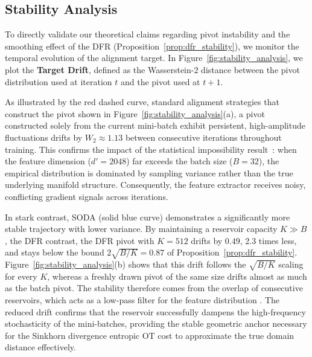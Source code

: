 \documentclass[preprint,12pt]{elsarticle}
\providecommand{\DIFadd}[1]{{\protect\color{blue} \sf #1}} %
\providecommand{\DIFdel}[1]{{\protect\color{red} \scriptsize #1}} %
\providecommand{\DIFaddbegin}{} %
\providecommand{\DIFaddend}{} %
\providecommand{\DIFdelbegin}{} %
\providecommand{\DIFdelend}{} %
\newcommand{\DIFscaledelfig}{0.5}
\newlength{\DIFdelgraphicswidth} %
\newlength{\DIFdelgraphicsheight} %
\newcommand{\DIFaddincludegraphics}[2][]{{\color{blue}\fbox{\DIFOincludegraphics[#1]{#2}}}} %
\newcommand{\DIFdelincludegraphics}[2][]{%
\sbox{\DIFdelgraphicsbox}{\DIFOincludegraphics[#1]{#2}}%
\settoboxwidth{\DIFdelgraphicswidth}{\DIFdelgraphicsbox} %
\settoboxtotalheight{\DIFdelgraphicsheight}{\DIFdelgraphicsbox} %
\scalebox{\DIFscaledelfig}{%
\parbox[b]{\DIFdelgraphicswidth}{\usebox{\DIFdelgraphicsbox}\\[-\baselineskip] \rule{\DIFdelgraphicswidth}{0em}}\llap{\resizebox{\DIFdelgraphicswidth}{\DIFdelgraphicsheight}{%
\setlength{\unitlength}{\DIFdelgraphicswidth}%
\begin{picture}(1,1)%
\thicklines\linethickness{2pt} %
{\color[rgb]{1,0,0}\put(0,0){\framebox(1,1){}}}%
{\color[rgb]{1,0,0}\put(0,0){\line( 1,1){1}}}%
{\color[rgb]{1,0,0}\put(0,1){\line(1,-1){1}}}%
\end{picture}%
}\hspace*{3pt}}} %
} %
\DeclareRobustCommand{\DIFaddbegin}{\DIFOaddbegin \let\includegraphics\DIFaddincludegraphics} %
\DeclareRobustCommand{\DIFaddend}{\DIFOaddend \let\includegraphics\DIFOincludegraphics} %
\DeclareRobustCommand{\DIFdelbegin}{\DIFOdelbegin \let\includegraphics\DIFdelincludegraphics} %
\DeclareRobustCommand{\DIFdelend}{\DIFOaddend \let\includegraphics\DIFOincludegraphics} %
\begin{document}
\subsection{Stability Analysis}
\label{sec:stability_analysis}

To directly validate our theoretical claims regarding pivot instability and the smoothing effect of the DFR (Proposition~\ref{prop:dfr_stability}), we monitor the temporal evolution of the alignment target. In Figure~\ref{fig:stability_analysis}, we plot the \textbf{Target Drift}, defined as the Wasserstein-2 distance between the pivot distribution used at iteration $t$ and the pivot used at $t+1$.

As \DIFdelbegin \DIFdel{illustrated by the red dashed curve, standard alignment strategies that construct the pivot }\DIFdelend \DIFaddbegin \DIFadd{shown in Figure~\ref{fig:stability_analysis}(a), a pivot constructed }\DIFaddend solely from the current mini-batch \DIFdelbegin \DIFdel{exhibit persistent, high-amplitude fluctuations}\DIFdelend \DIFaddbegin \DIFadd{drifts by $W_2\approx1.13$ between consecutive iterations throughout training}\DIFaddend . This confirms the impact of the statistical impossibility result~\citep{dong2025distribution}: when the feature dimension ($d'=2048$) far exceeds the batch size ($B=32$), the empirical distribution is dominated by sampling variance rather than the true underlying manifold structure. Consequently, the feature extractor receives noisy, conflicting gradient signals across iterations.

In \DIFdelbegin \DIFdel{stark contrast, SODA (solid blue curve) demonstrates a significantly more stable trajectory with lower variance. By maintaining a reservoir capacity $K \gg B$, the DFR }\DIFdelend \DIFaddbegin \DIFadd{contrast, the DFR pivot with $K=512$ drifts by $0.49$, 2.3 times less, and stays below the bound $2\sqrt{B/K}=0.87$ of Proposition~\ref{prop:dfr_stability}. Figure~\ref{fig:stability_analysis}(b) shows that this drift follows the $\sqrt{B/K}$ scaling for every $K$, whereas a freshly drawn pivot of the same size drifts almost as much as the batch pivot. The stability therefore comes from the overlap of consecutive reservoirs, which }\DIFaddend acts as a low-pass filter for the feature distribution\DIFdelbegin \DIFdel{. The reduced drift confirms that the reservoir successfully dampens the high-frequency stochasticity of the mini-batches}\DIFdelend , providing the stable geometric anchor necessary for the \DIFdelbegin \DIFdel{Sinkhorn divergence }\DIFdelend \DIFaddbegin \DIFadd{entropic OT cost }\DIFaddend to approximate the true domain distance effectively.
\end{document}
